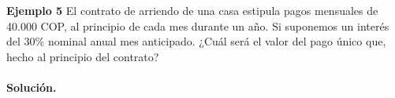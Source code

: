 \textbf{Ejemplo 5}\newline
El contrato de arriendo de una casa estipula pagos mensuales de 40.000 COP, al principio de cada mes durante un año. Si suponemos un interés del 30\% nominal anual mes anticipado. ¿Cuál será el valor del pago único que, hecho al principio del contrato?\\ \\

\textbf{Solución.}\\
